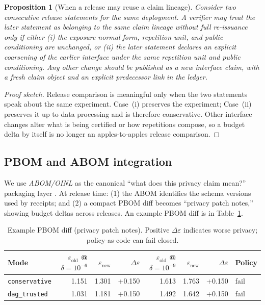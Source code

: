 \documentclass[11pt]{article}
\newtheorem{proposition}{Proposition}
\newcommand{\eps}{\varepsilon}
\begin{document}
\begin{proposition}[When a release may reuse a claim lineage]
\label{prop:lineage}
Consider two consecutive release statements for the same deployment.
A verifier may treat the later statement as belonging to the same claim lineage without full re-issuance only if either
(i) the exposure normal form, repetition unit, and public conditioning are unchanged, or
(ii) the later statement declares an explicit coarsening of the earlier interface under the same repetition unit and public conditioning.
Any other change should be published as a new interface claim, with a fresh claim object and an explicit predecessor link in the ledger.
\end{proposition}

\begin{proof}[Proof sketch]
Release comparison is meaningful only when the two statements speak about the same experiment.
Case~(i) preserves the experiment; Case~(ii) preserves it up to data processing and is therefore conservative.
Other interface changes alter what is being certified or how repetitions compose, so a budget delta by itself is no longer an apples-to-apples release comparison.
\end{proof}

\subsection{PBOM and ABOM integration}
We use \emph{ABOM/OINL} as the canonical ``what does this privacy claim mean?'' packaging layer \cite{series:abom}.
At release time:
(1) the ABOM identifies the schema versions used by receipts; and
(2) a compact PBOM diff becomes ``privacy patch notes,'' showing budget deltas across releases.
An example PBOM diff is in Table~\ref{tab:pbom-diff}.

\begin{table}[t]
\centering
\small
\begin{tabular}{@{}lrrrrrrl@{}}
\toprule
Mode & $\eps_\text{old}$ @ $\delta=10^{-6}$ & $\eps_\text{new}$ & $\Delta\eps$ & $\eps_\text{old}$ @ $\delta=10^{-9}$ & $\eps_\text{new}$ & $\Delta\eps$ & Policy \\
\midrule
\texttt{conservative} & 1.151 & 1.301 & +0.150 & 1.613 & 1.763 & +0.150 & fail \\
\texttt{dag\_trusted} & 1.031 & 1.181 & +0.150 & 1.492 & 1.642 & +0.150 & fail \\
\bottomrule
\end{tabular}
\caption{Example PBOM diff (privacy patch notes). Positive $\Delta\eps$ indicates worse privacy; policy-as-code can fail closed.}
\label{tab:pbom-diff}
\end{table}
\end{document}
